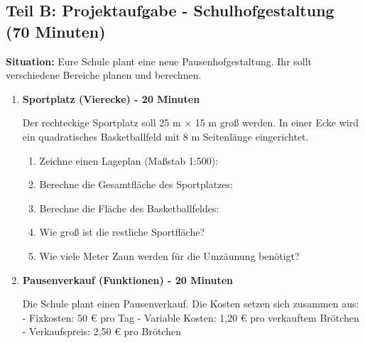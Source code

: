 \subsection*{Teil B: Projektaufgabe - Schulhofgestaltung (70 Minuten)}

\textbf{Situation:} Eure Schule plant eine neue Pausenhofgestaltung. Ihr sollt verschiedene Bereiche planen und berechnen.

\begin{enumerate}[label=\arabic*.,resume]

    \item \textbf{Sportplatz (Vierecke) - 20 Minuten}

    Der rechteckige Sportplatz soll 25 m × 15 m groß werden. In einer Ecke wird ein quadratisches Basketballfeld mit 8 m Seitenlänge eingerichtet.

    \begin{enumerate}[label=\alph*)]
        \item Zeichne einen Lageplan (Maßstab 1:500):

        \vspace{4cm}

        \item Berechne die Gesamtfläche des Sportplatzes:

        \vspace{1.5cm}

        \item Berechne die Fläche des Basketballfeldes:

        \vspace{1.5cm}

        \item Wie groß ist die restliche Sportfläche?

        \vspace{1.5cm}

        \item Wie viele Meter Zaun werden für die Umzäunung benötigt?

        \vspace{1.5cm}

    \end{enumerate}

    \item \textbf{Pausenverkauf (Funktionen) - 20 Minuten}

    Die Schule plant einen Pausenverkauf. Die Kosten setzen sich zusammen aus:
    - Fixkosten: 50 € pro Tag
    - Variable Kosten: 1,20 € pro verkauftem Brötchen
    - Verkaufspreis: 2,50 € pro Brötchen


\end{enumerate}
